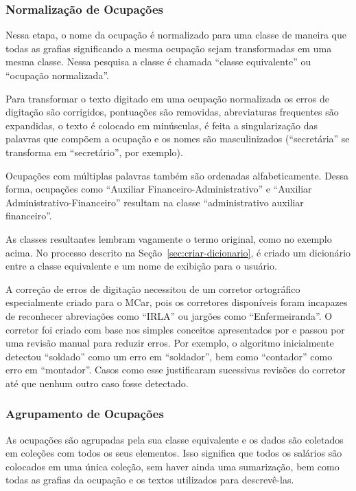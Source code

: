 \documentclass[12pt,a4paper]{article}
\begin{document}
\subsubsection{Normalização de Ocupações} \label{sec:normalizacao}

Nessa etapa, o nome da ocupação é normalizado para uma classe de maneira que todas as grafias significando a mesma ocupação sejam transformadas em uma mesma classe. Nessa pesquisa a classe é chamada \enquote{classe equivalente} ou \enquote{ocupação normalizada}.

Para transformar o texto digitado em uma ocupação normalizada os erros de digitação são corrigidos, pontuações são removidas, abreviaturas frequentes são expandidas, o texto é colocado em minúsculas, é feita a singularização das palavras que compõem a ocupação e os nomes são masculinizados (\enquote{secretária} se transforma em \enquote{secretário}, por exemplo).

Ocupações com múltiplas palavras também são ordenadas alfabeticamente. Dessa forma, ocupações como \enquote{Auxiliar Financeiro-Administrativo} e \enquote{Auxiliar Administrativo-Financeiro} resultam na classe \enquote{administrativo auxiliar financeiro}.

As classes resultantes lembram vagamente o termo original, como no exemplo acima. No processo descrito na Seção~\ref{sec:criar-dicionario}, é criado um dicionário entre a classe equivalente e um nome de exibição para o usuário.

A correção de erros de digitação necessitou de um corretor ortográfico especialmente criado para o MCar, pois os corretores disponíveis foram incapazes de reconhecer abreviações como \enquote{IRLA} ou jargões como \enquote{Enfermeiranda}. O corretor foi criado com base nos simples conceitos apresentados por  e passou por uma revisão manual para reduzir erros. Por exemplo, o algoritmo inicialmente detectou \enquote{soldado} como um erro em \enquote{soldador}, bem como \enquote{contador} como erro em \enquote{montador}. Casos como esse justificaram sucessivas revisões do corretor até que nenhum outro caso fosse detectado.


\subsubsection{Agrupamento de Ocupações}

As ocupações são agrupadas pela sua classe equivalente e os dados são coletados em coleções com todos os seus elementos. Isso significa que todos os salários são colocados em uma única coleção, sem haver ainda uma sumarização, bem como todas as grafias da ocupação e os textos utilizados para descrevê-las.
\end{document}
